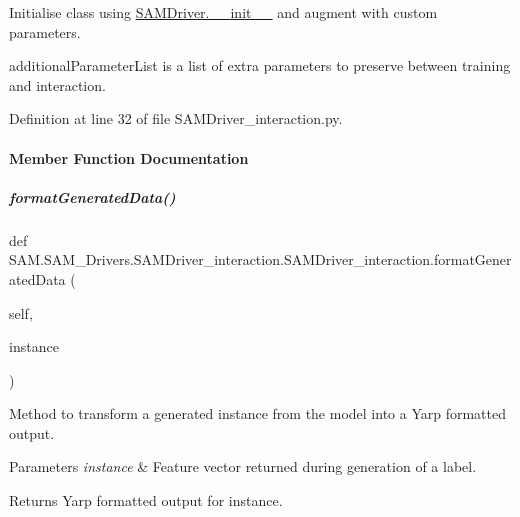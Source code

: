 Initialise class using \hyperlink{group__icubclient__SAM__Drivers_gac35ec3eea80d1fb5704758a9c53267a1}{S\+A\+M\+Driver.\+\_\+\+\_\+init\+\_\+\+\_\+} and augment with custom parameters. 

additional\+Parameter\+List is a list of extra parameters to preserve between training and interaction. 

Definition at line 32 of file S\+A\+M\+Driver\+\_\+interaction.\+py.



\paragraph{Member Function Documentation}
\mbox{\label{group__icubclient__SAM__Drivers_af99e275c9f691489b795d33d52b4bbfc}} 
\subparagraph{\texorpdfstring{format\+Generated\+Data()}{formatGeneratedData()}}
{\footnotesize\ttfamily def S\+A\+M.\+S\+A\+M\+\_\+\+Drivers.\+S\+A\+M\+Driver\+\_\+interaction.\+S\+A\+M\+Driver\+\_\+interaction.\+format\+Generated\+Data (\begin{DoxyParamCaption}\item[{}]{self,  }\item[{}]{instance }\end{DoxyParamCaption})}



Method to transform a generated instance from the model into a Yarp formatted output. 


\begin{DoxyParams}{Parameters}
{\em instance} & Feature vector returned during generation of a label.\\
\hline
\end{DoxyParams}
\begin{DoxyReturn}{Returns}
Yarp formatted output for instance. 
\end{DoxyReturn}


